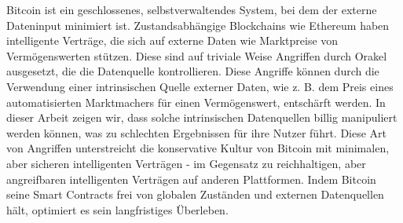 Bitcoin ist ein geschlossenes, selbstverwaltendes System, bei dem der externe Dateninput minimiert ist. Zustandsabhängige Blockchains wie Ethereum haben intelligente Verträge, die sich auf externe Daten wie Marktpreise von Vermögenswerten stützen. Diese sind auf triviale Weise Angriffen durch Orakel ausgesetzt, die die Datenquelle kontrollieren. Diese Angriffe können durch die Verwendung einer intrinsischen Quelle externer Daten, wie z. B. dem Preis eines automatisierten Marktmachers für einen Vermögenswert, entschärft werden. In dieser Arbeit zeigen wir, dass solche intrinsischen Datenquellen billig manipuliert werden können, was zu schlechten Ergebnissen für ihre Nutzer führt. Diese Art von Angriffen unterstreicht die konservative Kultur von Bitcoin mit minimalen, aber sicheren intelligenten Verträgen - im Gegensatz zu reichhaltigen, aber angreifbaren intelligenten Verträgen auf anderen Plattformen. Indem Bitcoin seine Smart Contracts frei von globalen Zuständen und externen Datenquellen hält, optimiert es sein langfristiges Überleben.